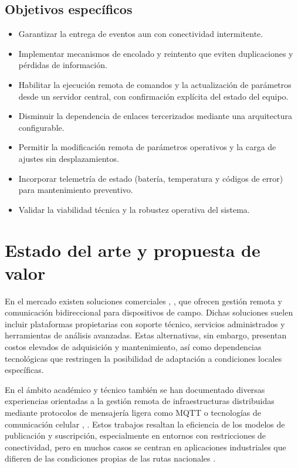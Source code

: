 \subsection{Objetivos específicos}
\begin{itemize}

\item  Garantizar la entrega de eventos aun con conectividad intermitente.

\item Implementar mecanismos de encolado y reintento que eviten duplicaciones y pérdidas de información.

\item  Habilitar la ejecución remota de comandos y la actualización de parámetros desde un servidor central, con confirmación explícita del estado del equipo.

\item  Disminuir la dependencia de enlaces tercerizados mediante una arquitectura configurable.

\item  Permitir la modificación remota de parámetros operativos y la carga de ajustes sin desplazamientos.

\item Incorporar telemetría de estado (batería, temperatura y códigos de error) para mantenimiento preventivo.

\item Validar la viabilidad técnica y la robustez operativa del sistema.
\end{itemize}


\section{Estado del arte y propuesta de valor}

En el mercado existen soluciones comerciales \cite{exemys}, \cite{digiRemoteManager}, que ofrecen gestión remota y comunicación bidireccional para dispositivos de campo. Dichas soluciones suelen incluir plataformas propietarias con soporte técnico, servicios administrados y herramientas de análisis avanzadas. Estas alternativas, sin embargo, presentan costos elevados de adquisición y mantenimiento, así como dependencias tecnológicas que restringen la posibilidad de adaptación a condiciones locales específicas.

En el ámbito académico y técnico también se han documentado diversas experiencias orientadas a la gestión remota de infraestructuras distribuidas mediante protocolos de mensajería ligera como MQTT o tecnologías de comunicación celular \cite{monitoringVehicles2023}, \cite{iotSmartTraffic2021}. Estos trabajos resaltan la eficiencia de los modelos de publicación y suscripción, especialmente en entornos con restricciones de conectividad, pero en muchos casos se centran en aplicaciones industriales que difieren de las condiciones propias de las rutas nacionales \cite{iopMQTTSystem2023}.

